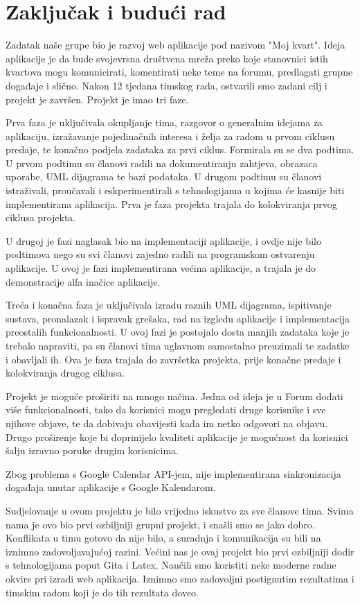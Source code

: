 \chapter{Zaključak i budući rad}
		
		Zadatak naše grupe bio je razvoj web aplikacije pod nazivom "Moj kvart". Ideja aplikacije je da bude svojevrsna društvena mreža preko koje stanovnici istih kvartova mogu komunicirati, komentirati neke teme na forumu, predlagati grupne događaje i slično. Nakon 12 tjedana timskog rada, ostvarili smo zadani cilj i projekt je završen. Projekt je imao tri faze.
		
		Prva faza je uključivala okupljanje tima, razgovor o generalnim idejama za aplikaciju, izražavanje pojedinačnih interesa i želja za radom u prvom ciklusu predaje, te konačno podjela zadataka za prvi ciklus. Formirala su se dva podtima. U prvom podtimu su članovi radili na dokumentiranju zahtjeva, obrazaca uporabe, UML dijagrama te bazi podataka. U drugom podtimu su članovi istraživali, proučavali i eskperimentirali s tehnologijama u kojima će kasnije biti implementirana aplikacija. Prva je faza projekta trajala do kolokviranja prvog ciklusa projekta.
		
		U drugoj je fazi naglasak bio na implementaciji aplikacije, i ovdje nije bilo podtimova nego su svi članovi zajedno radili na programskom ostvarenju aplikacije. U ovoj je fazi implementirana većina aplikacije, a trajala je do demonstracije alfa inačice aplikacije.
		
		Treća i konačna faza je uključivala izradu raznih UML dijagrama, ispitivanje sustava, pronalazak i ispravak grešaka, rad na izgledu aplikacije i implementacija preostalih funkcionalnosti. U ovoj fazi je postojalo dosta manjih zadataka koje je trebalo napraviti, pa su članovi tima uglavnom samostalno preuzimali te zadatke i obavljali ih. Ova je faza trajala do završetka projekta, prije konačne predaje i kolokviranja drugog ciklusa.
		
		Projekt je moguće proširiti na mnogo načina. Jedna od ideja je u Forum dodati više funkcionalnosti, tako da korisnici mogu pregledati druge korisnike i sve njihove objave, te da dobivaju obavijesti kada im netko odgovori na objavu. Drugo proširenje koje bi doprinijelo kvaliteti aplikacije je mogućnost da korisnici šalju izravno poruke drugim korisnicima.
		
		Zbog problema s Google Calendar API-jem, nije implementirana sinkronizacija događaja unutar aplikacije s Google Kalendarom.
		
		Sudjelovanje u ovom projektu je bilo vrijedno iskustvo za sve članove tima. Svima nama je ovo bio prvi ozbiljniji grupni projekt, i snašli smo se jako dobro. Konflikata u timu gotovo da nije bilo, a suradnja i komunikacija su bili na iznimno zadovoljavajućoj razini. Većini nas je ovaj projekt bio prvi ozbiljniji dodir s tehnologijama poput Gita i Latex. Naučili smo koristiti neke moderne radne okvire pri izradi web aplikacija. Iznimno smo zadovoljni postignutim rezultatima i timskim radom koji je do tih rezultata doveo.
		
		\eject 